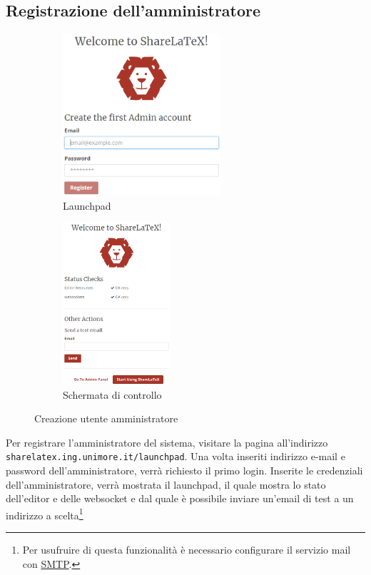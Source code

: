 \subsection{Registrazione dell'amministratore}
\begin{figure}[h]
    \begin{subfigure}{0.5\textwidth}
        \centering
        \includegraphics[height=6cm]{immagini/launchpad_1.png}
        \caption{Launchpad}
        \label{fig:sharelatex_launchpad_1}
    \end{subfigure}
    \begin{subfigure}{0.5\textwidth}
        \centering
        \includegraphics[height=6cm]{immagini/launchpad_2.png}
        \caption{Schermata di controllo}
        \label{fig:sharelatex_launchpad_2}
    \end{subfigure}
    \caption{Creazione utente amministratore}
    \label{fig:sharelatex_launchpad}
\end{figure}
\noindent Per registrare l'amministratore del sistema, visitare la pagina all'indirizzo\\\verb|sharelatex.ing.unimore.it/launchpad|. Una volta inseriti indirizzo e-mail e password dell'amministratore, verrà richiesto il primo login. Inserite le credenziali dell'amministratore, verrà mostrata il launchpad, il quale mostra lo stato dell'editor e delle websocket e dal quale è possibile inviare un'email di test a un indirizzo a scelta\footnote{Per usufruire di questa funzionalità è necessario configurare il servizio mail con \hyperref[SMTP]{SMTP}.}

